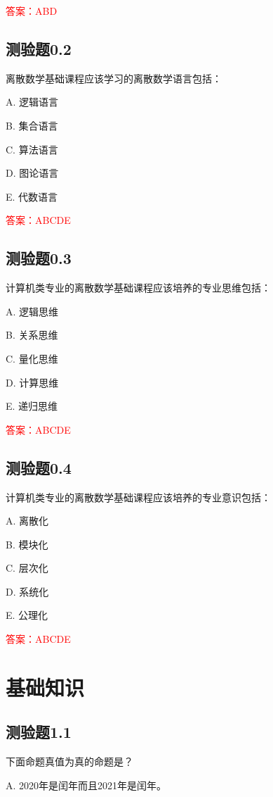 \documentclass[UTF8, heading=true]{ctexart}
\begin{document}
\textcolor{red}{答案：ABD}

\subsection{测验题0.2}

离散数学基础课程应该学习的离散数学语言包括：

A. 逻辑语言

B. 集合语言

C. 算法语言

D. 图论语言

E. 代数语言

\textcolor{red}{答案：ABCDE}

\subsection{测验题0.3}

计算机类专业的离散数学基础课程应该培养的专业思维包括：

A. 逻辑思维

B. 关系思维

C. 量化思维

D. 计算思维

E. 递归思维

\textcolor{red}{答案：ABCDE}

\subsection{测验题0.4}

计算机类专业的离散数学基础课程应该培养的专业意识包括：

A. 离散化

B. 模块化

C. 层次化

D. 系统化

E. 公理化

\textcolor{red}{答案：ABCDE}

\clearpage

\section{基础知识}

\subsection{测验题1.1}

下面命题真值为真的命题是？

A. 2020年是闰年而且2021年是闰年。
\end{document}
